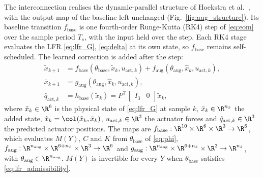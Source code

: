 The interconnection realises the dynamic-parallel structure of Hoekstra et
al.~\cite[Table~1]{hoekstra2026lfr}, with the output map of the baseline left
unchanged (Fig.~\ref{fig:aug_structure}).
Its baseline transition $f_{\mathrm{base}}$ is one fourth-order Runge-Kutta
(RK4) step of \eqref{eq:eom} over the sample period $T_s$, with the input held
over the step.
Each RK4 stage evaluates the LFR \eqref{eq:lfr_G}, \eqref{eq:delta} at its own
state, so $f_{\mathrm{base}}$ remains self-scheduled.
The learned correction is added after the step:
\begin{equation}
\begin{aligned}
 \tilde x_{k+1}&=f_{\mathrm{base}}(\theta_{\mathrm{base}},\tilde x_k,u_{\mathrm{act},k})
   +f_{\mathrm{aug}}(\theta_{\mathrm{aug}},\hat x_k,u_{\mathrm{act},k}),\\
 \bar x_{k+1}&=g_{\mathrm{aug}}(\theta_{\mathrm{aug}},\hat x_k,u_{\mathrm{act},k}),\\
 \hat q_{\mathrm{act},k}&=h_{\mathrm{base}}(\tilde x_k)
   =P^\top\begin{bmatrix}I_3&0\end{bmatrix}\tilde x_k,
\end{aligned}
\label{eq:aug_transition}
\end{equation}
where $\tilde x_k\in\R^6$ is the physical state of \eqref{eq:lfr_G} at sample
$k$, $\bar x_k\in\R^{n_{\bar x}}$ the added state,
$\hat x_k=\col(\tilde x_k,\bar x_k)$, $u_{\mathrm{act},k}\in\R^3$ the actuator
forces and $\hat q_{\mathrm{act},k}\in\R^3$ the predicted actuator positions.
The maps are $f_{\mathrm{base}}:\R^{10}\times\R^6\times\R^3\to\R^6$, which
evaluates $M(Y)$, $C$ and $K$ from $\theta_{\mathrm{base}}$ of \eqref{eq:phi},
$f_{\mathrm{aug}}:\R^{n_{\mathrm{aug}}}\times\R^{6+n_{\bar x}}\times\R^3\to\R^6$
and $g_{\mathrm{aug}}:\R^{n_{\mathrm{aug}}}\times\R^{6+n_{\bar x}}\times\R^3
\to\R^{n_{\bar x}}$, with $\theta_{\mathrm{aug}}\in\R^{n_{\mathrm{aug}}}$.
$M(Y)$ is invertible for every $Y$ when $\theta_{\mathrm{base}}$ satisfies
\eqref{eq:lfr_admissibility}.

